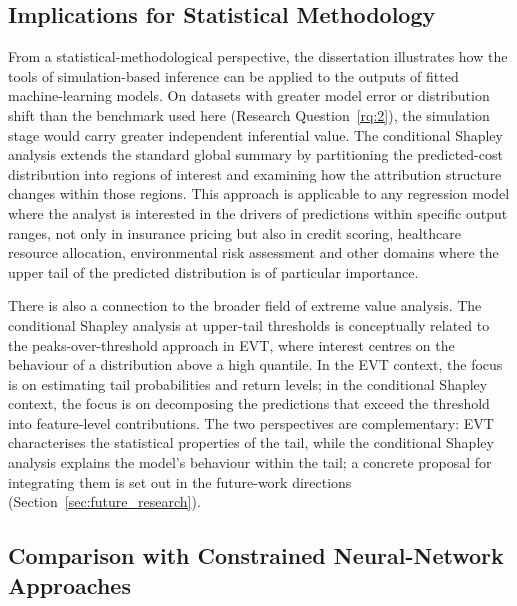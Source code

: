 
\subsection{Implications for Statistical Methodology}
\label{sec:implications_statistical}

From a statistical-methodological perspective, the dissertation
illustrates how the tools of simulation-based inference can be applied
to the outputs of fitted machine-learning models.  On datasets with
greater model error or distribution shift than the benchmark used here
(Research Question~\ref{rq:2}), the simulation stage would carry greater
independent inferential value.
The conditional Shapley analysis extends the standard global summary by
partitioning the predicted-cost distribution into regions of interest
and examining how the attribution structure changes within those
regions.  This approach is applicable to any regression model where the
analyst is interested in the drivers of predictions within specific
output ranges, not only in insurance pricing but also in credit scoring,
healthcare resource allocation, environmental risk assessment and other
domains where the upper tail of the predicted distribution is of
particular importance.

There is also a connection to the broader field of extreme value analysis.
The conditional Shapley analysis at upper-tail thresholds is conceptually
related to the peaks-over-threshold approach in EVT,
where interest centres on the behaviour of a distribution above a high
quantile.  In the EVT context, the focus is on estimating tail
probabilities and return levels; in the conditional Shapley context, the
focus is on decomposing the predictions that exceed the threshold into
feature-level contributions.  The two perspectives are complementary: EVT
characterises the statistical properties of the tail, while the
conditional Shapley analysis explains the model's behaviour within the
tail; a concrete proposal for integrating them is set out in the future-work
directions (Section~\ref{sec:future_research}).


\subsection{Comparison with Constrained Neural-Network Approaches}
\label{sec:comparison_constrained_nn}

